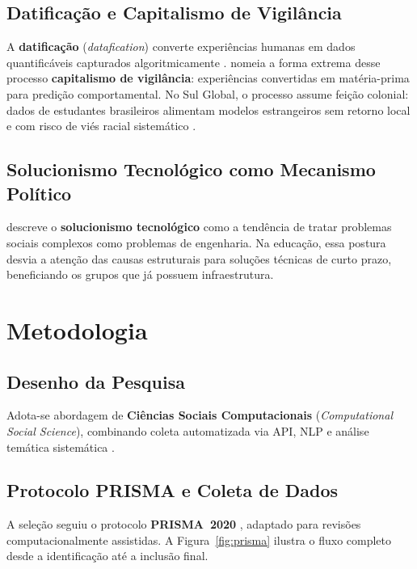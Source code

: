 \documentclass[preprint,12pt,authoryear]{elsarticle}
\begin{document}
\subsection{Datificação e Capitalismo de Vigilância}

A \textbf{datificação} (\textit{datafication}) converte experiências
humanas em dados quantificáveis capturados algoritmicamente
\citep{VanDijck2014}.
\citet{Zuboff2019} nomeia a forma extrema desse processo
\textbf{capitalismo de vigilância}: experiências convertidas em
matéria-prima para predição comportamental.
No Sul Global, o processo assume feição colonial: dados de estudantes
brasileiros alimentam modelos estrangeiros sem retorno local e com
risco de viés racial sistemático \citep{Noble2018}.

\subsection{Solucionismo Tecnológico como Mecanismo Político}

\citet{Morozov2013} descreve o \textbf{solucionismo tecnológico}
como a tendência de tratar problemas sociais complexos como problemas
de engenharia.
Na educação, essa postura desvia a atenção das causas estruturais
para soluções técnicas de curto prazo, beneficiando os grupos que
já possuem infraestrutura.

\section{Metodologia}

\subsection{Desenho da Pesquisa}

Adota-se abordagem de \textbf{Ciências Sociais Computacionais}
(\textit{Computational Social Science}), combinando coleta
automatizada via API, NLP e análise temática sistemática
\citep{Lazer2020}.

\subsection{Protocolo PRISMA e Coleta de Dados}

A seleção seguiu o protocolo \textbf{PRISMA~2020} \citep{Page2021},
adaptado para revisões computacionalmente assistidas.
A Figura~\ref{fig:prisma} ilustra o fluxo completo desde a
identificação até a inclusão final.
\end{document}
